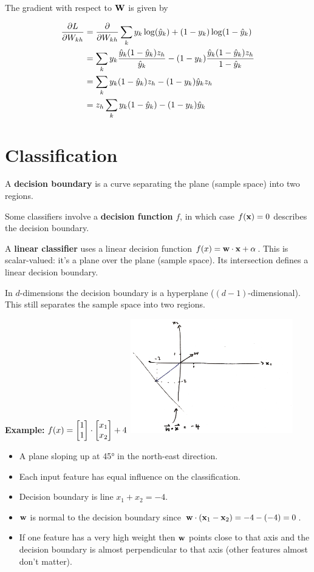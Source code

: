 \documentclass[12pt]{article}
\begin{document}
The gradient with respect to $\mathbf W$ is given by

\begin{align*}
  \frac{\partial L}{\partial W_{kh}}
  &= \frac{\partial }{\partial W_{kh}} \sum_k y_k \log(\hat{y}_k) + (1 - y_k) \log( 1 - \hat{y}_k) \\
  &= \sum_k y_k      \frac{ \hat{y}_k (1 - \hat{y}_k)z_h }{ \hat{y}_k } -
           (1 - y_k) \frac{ \hat{y}_k (1 - \hat{y}_k)z_h}{ 1 - \hat{y}_k} \\
  &= \sum_k y_k (1 - \hat{y}_k)z_h - (1 - y_k) \hat{y}_k z_h \\
  &= z_h \sum_k y_k (1 - \hat{y}_k) - (1 - y_k) \hat{y}_k \\
\end{align*}



\section*{Classification}

A \textbf{decision boundary} is a curve separating the plane (sample space)
into two regions.

Some classifiers involve a \textbf{decision function} $f$, in which case
$f(\mathbf x) = 0$ describes the decision boundary.

A \textbf{linear classifier} uses a linear decision function
$f(x) = \mathbf w \cdot \mathbf x + \alpha$. This is scalar-valued: it's a plane over
the plane (sample space). Its intersection defines a linear decision boundary.

In $d$-dimensions the decision boundary is a hyperplane
($(d-1)$-dimensional). This still separates the sample space into two regions.

\textbf{Example:} $f(x) = \begin{bmatrix}1\\1\end{bmatrix} \cdot \begin{bmatrix}x_1\\x_2\end{bmatrix} + 4$
\includegraphics[width=200pt]{img/machine-learning-linear-decision-boundary.png}
\begin{itemize}
\item A plane sloping up at 45° in the north-east direction.
\item Each input feature has equal influence on the classification.
\item Decision boundary is line $x_1 + x_2 = -4$.
\item $\mathbf w$ is normal to the decision boundary since $\mathbf w \cdot (\mathbf x_1 - \mathbf x_2) = -4 - (-4) = 0$.
\item If one feature has a very high weight then $\mathbf w$ points close to that
  axis and the decision boundary is almost perpendicular to that axis (other
  features almost don't matter).
\end{itemize}
\end{document}
